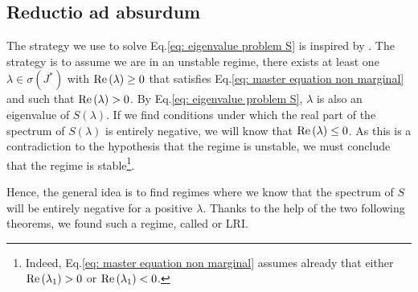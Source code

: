 \documentclass[12pt, titlepage]{report}
\begin{document}
\subsection{Reductio ad absurdum} \label{subsubsec: reductio ad absurdum}
The strategy we use to solve Eq.\eqref{eq: eigenvalue problem S} is inspired by \cite{butler_stability_2018}. The strategy is to assume we are in an unstable regime, \ie there exists at least one $\lambda \in \sigma(J^*)$ with $\text{Re}\left(\lambda\right)\geq 0$ that satisfies Eq.\eqref{eq: master equation non marginal} and such that $\text{Re}\left(\lambda\right) > 0$. By Eq.\eqref{eq: eigenvalue problem S}, $\lambda$ is also an eigenvalue of $S(\lambda)$. If we find conditions under which the real part of the spectrum of $S(\lambda)$ is entirely negative, we will know that $\text{Re}\left(\lambda\right) \leq 0$. As this is a contradiction to the hypothesis that the regime is unstable, we must conclude that the regime is stable\footnote{Indeed, Eq.\eqref{eq: master equation non marginal} assumes already that either $\text{Re}\left(\lambda_1\right) >0$ or $\text{Re}\left(\lambda_1\right) < 0$.}.

Hence, the general idea is to find regimes where we know that the spectrum of $S$%
will be entirely negative for a positive $\lambda$. Thanks to the help of the two following theorems, we found such a regime, called  or LRI.
\end{document}
